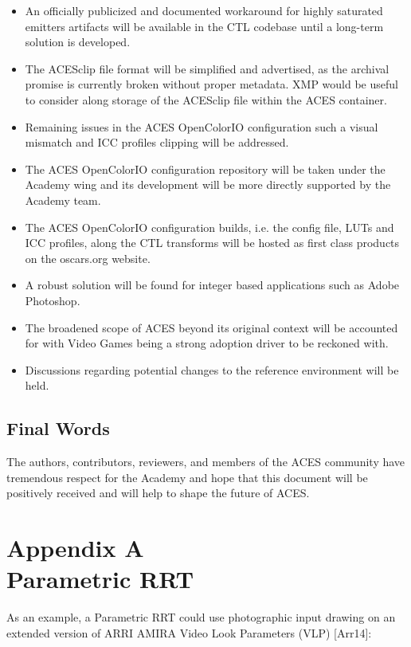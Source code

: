 \documentclass[conference]{IEEEtran}
\begin{document}
\begin{itemize}
	\item An officially publicized and documented workaround for highly saturated emitters artifacts will be available in the CTL codebase until a long-term solution is developed.
	\item The ACESclip file format will be simplified and advertised, as the archival promise is currently broken without proper metadata. XMP would be useful to consider along storage of the ACESclip file within the ACES container.
	\item Remaining issues in the ACES OpenColorIO configuration such a visual mismatch and ICC profiles clipping will be addressed.
	\item The ACES OpenColorIO configuration repository will be taken under the Academy wing and its development will be more directly supported by the Academy team.
	\item The ACES OpenColorIO configuration builds, i.e. the config file, LUTs and ICC profiles, along the CTL transforms will be hosted as first class products on the oscars.org website.
	\item A robust solution will be found for integer based applications such as Adobe Photoshop.
	\item The broadened scope of ACES beyond its original context will be accounted for with Video Games being a strong adoption driver to be reckoned with.
	\item Discussions regarding potential changes to the reference environment will be held.
\end{itemize}

\subsection{Final Words}
The authors, contributors, reviewers, and members of the ACES community have tremendous respect for the Academy and hope that this document will be positively received and will help to shape the future of ACES.

\newpage

\section*{Appendix A\\ \small Parametric RRT}
As an example, a Parametric RRT could use photographic input drawing on an extended version of ARRI AMIRA Video Look Parameters (VLP) [Arr14]:
\end{document}
